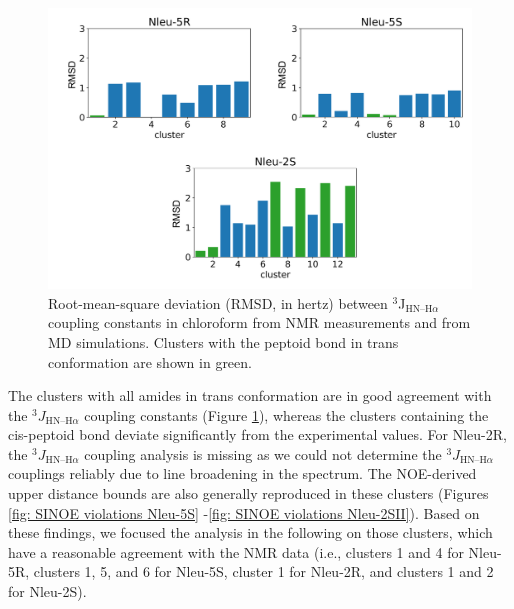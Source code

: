 \begin{figure}[h!]
    \centering
    \includegraphics[width=\textwidth]{7_chapter_5/fig/results/j3NMRConfClusterAna.png}
    \caption{Root-mean-square deviation (RMSD, in hertz) between $^3$J$_{\text{HN–H}\alpha}$ coupling constants in chloroform from NMR measurements and from MD simulations. Clusters with the peptoid bond in trans conformation are shown in green.}
    \label{fig: j3NMRConfClusterAna}
\end{figure}

The clusters with all amides in trans conformation are in good agreement with the  $^3J_{\text{HN–H}\alpha}$ coupling constants (Figure \ref{fig: j3NMRConfClusterAna}), whereas the clusters containing the cis-peptoid bond deviate significantly from the experimental values. For Nleu-2R, the $^3J_{\text{HN–H}\alpha}$ coupling analysis is missing as we could not determine the $^3J_{\text{HN–H}\alpha}$ couplings reliably due to line broadening in the spectrum. The NOE-derived upper distance bounds are also generally reproduced in these clusters (Figures \ref{fig: SINOE violations Nleu-5S} -\ref{fig: SINOE violations Nleu-2SII}). Based on these findings, we focused the analysis in the following on those clusters, which have a reasonable agreement with the NMR data (i.e., clusters 1 and 4 for Nleu-5R, clusters 1, 5, and 6 for Nleu-5S, cluster 1 for Nleu-2R, and clusters 1 and 2 for Nleu-2S).


